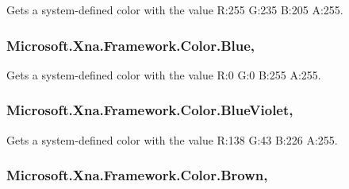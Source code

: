 Gets a system-\/defined color with the value R\+:255 G\+:235 B\+:205 A\+:255.

\hypertarget{struct_microsoft_1_1_xna_1_1_framework_1_1_color_aecbccaea65e06cd1dff26b274906d305}{}
\subsubsection[{Blue}]{ Microsoft.\+Xna.\+Framework.\+Color.\+Blue\hspace{0.3cm}{\ttfamily [static]}, {\ttfamily [get]}}\label{struct_microsoft_1_1_xna_1_1_framework_1_1_color_aecbccaea65e06cd1dff26b274906d305}


Gets a system-\/defined color with the value R\+:0 G\+:0 B\+:255 A\+:255.

\hypertarget{struct_microsoft_1_1_xna_1_1_framework_1_1_color_a2fdcf941c1df9fe8f305f50887c867c7}{}
\subsubsection[{Blue\+Violet}]{ Microsoft.\+Xna.\+Framework.\+Color.\+Blue\+Violet\hspace{0.3cm}{\ttfamily [static]}, {\ttfamily [get]}}\label{struct_microsoft_1_1_xna_1_1_framework_1_1_color_a2fdcf941c1df9fe8f305f50887c867c7}


Gets a system-\/defined color with the value R\+:138 G\+:43 B\+:226 A\+:255.

\hypertarget{struct_microsoft_1_1_xna_1_1_framework_1_1_color_ad57ebb2d75ec7fd1b95636a274e0c0a9}{}
\subsubsection[{Brown}]{ Microsoft.\+Xna.\+Framework.\+Color.\+Brown\hspace{0.3cm}{\ttfamily [static]}, {\ttfamily [get]}}\label{struct_microsoft_1_1_xna_1_1_framework_1_1_color_ad57ebb2d75ec7fd1b95636a274e0c0a9}


